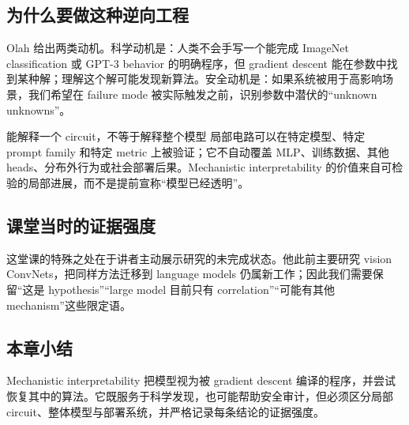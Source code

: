 \subsection{为什么要做这种逆向工程}

Olah 给出两类动机。科学动机是：人类不会手写一个能完成 ImageNet classification 或 GPT-3 behavior 的明确程序，但 gradient descent 能在参数中找到某种解；理解这个解可能发现新算法。安全动机是：如果系统被用于高影响场景，我们希望在 failure mode 被实际触发之前，识别参数中潜伏的“unknown unknowns”。


\begin{warningbox}{能解释一个 circuit，不等于解释整个模型}
局部电路可以在特定模型、特定 prompt family 和特定 metric 上被验证；它不自动覆盖 MLP、训练数据、其他 heads、分布外行为或社会部署后果。Mechanistic interpretability 的价值来自可检验的局部进展，而不是提前宣称“模型已经透明”。
\end{warningbox}

\subsection{课堂当时的证据强度}

这堂课的特殊之处在于讲者主动展示研究的未完成状态。他此前主要研究 vision ConvNets，把同样方法迁移到 language models 仍属新工作；因此我们需要保留“这是 hypothesis”“large model 目前只有 correlation”“可能有其他 mechanism”这些限定语。



\subsection{本章小结}

Mechanistic interpretability 把模型视为被 gradient descent 编译的程序，并尝试恢复其中的算法。它既服务于科学发现，也可能帮助安全审计，但必须区分局部 circuit、整体模型与部署系统，并严格记录每条结论的证据强度。

